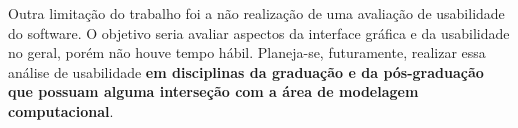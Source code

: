 \documentclass[
	12pt,				%
	openright,			%
	oneside,			%
	a4paper,			%
	main=brazil,
	english,			%
	]{ufsj-abntex2}
\begin{document}
Outra limitação do trabalho foi a não realização de uma avaliação de usabilidade do software. O objetivo seria avaliar aspectos da interface gráfica e da usabilidade no geral, porém não houve tempo hábil. Planeja-se, futuramente, realizar essa análise de usabilidade \textbf{em disciplinas da graduação e da pós-graduação que possuam alguma interseção com a área de modelagem computacional}.  



\postextual







\end{document}
